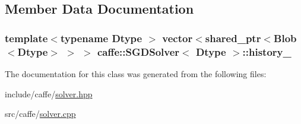 \subsection{Member Data Documentation}
\hypertarget{classcaffe_1_1_s_g_d_solver_a66a7a1d7d3543e861057861be3e079a4}{
\subsubsection[{history\+\_\+}]{\setlength{\rightskip}{0pt plus 5cm}template$<$typename Dtype $>$ vector$<$shared\+\_\+ptr$<${\bf Blob}$<$Dtype$>$ $>$ $>$ {\bf caffe\+::\+S\+G\+D\+Solver}$<$ Dtype $>$\+::history\+\_\+\hspace{0.3cm}{\ttfamily [protected]}}}\label{classcaffe_1_1_s_g_d_solver_a66a7a1d7d3543e861057861be3e079a4}


The documentation for this class was generated from the following files\+:\begin{DoxyCompactItemize}
\item 
include/caffe/\hyperlink{solver_8hpp}{solver.\+hpp}\item 
src/caffe/\hyperlink{solver_8cpp}{solver.\+cpp}\end{DoxyCompactItemize}
